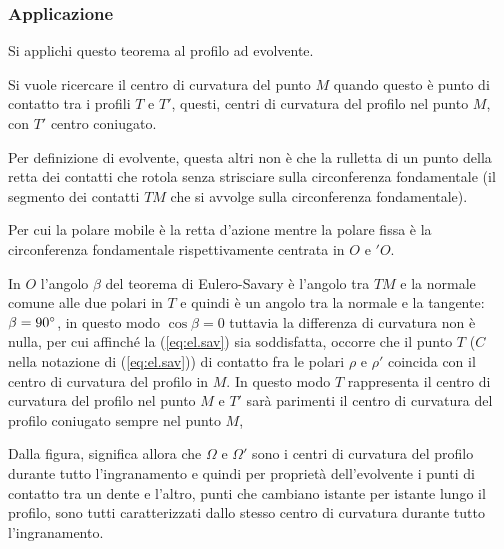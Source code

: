 \documentclass[a4paper, 15pt]{article}
\begin{document}
	\subsubsection{Applicazione}
	\begin{adjustwidth}{2in}{}
		Si applichi questo teorema al profilo ad evolvente.
		
		Si vuole ricercare il centro di curvatura del punto $M$ quando questo è punto di contatto tra i profili $T$ e $T'$, questi, centri di curvatura del profilo nel punto $M$, con $T'$ centro coniugato.
		
		Per definizione di evolvente, questa altri non è che la rulletta di un punto della retta dei contatti che rotola senza strisciare sulla circonferenza fondamentale (il segmento dei contatti $TM$ che si avvolge sulla circonferenza fondamentale). 
		
		Per cui la polare mobile è la retta d'azione mentre la polare fissa è la circonferenza fondamentale rispettivamente centrata in $O$ e $'O$. \newline
		
		In $O$ l'angolo $\beta$ del teorema di Eulero-Savary è l'angolo tra $TM$ e la normale comune alle due polari in $T$ e quindi è un angolo tra la normale e la tangente: $\beta=90\degree$, in questo modo $\cos\beta=0$ tuttavia la differenza di curvatura non è nulla, per cui affinché la (\ref{eq:el.sav}) sia soddisfatta, occorre che il punto $T$ ($C$ nella notazione di (\ref{eq:el.sav})) di contatto fra le polari $\rho$ e $\rho'$ coincida con il centro di curvatura del profilo in $M$. 
\newpage		
		In questo modo $T$ rappresenta il centro di curvatura del profilo nel punto $M$ e $T'$ sarà parimenti il centro di curvatura del profilo coniugato sempre nel punto $M$, 
		
		Dalla figura, significa allora che $\Omega$ e $\Omega'$ sono i centri di curvatura del profilo durante tutto l'ingranamento e quindi per proprietà dell'evolvente i punti di contatto tra un dente e l'altro, punti che cambiano istante per istante lungo il profilo, sono tutti caratterizzati dallo stesso centro di curvatura durante tutto l'ingranamento.\newline 
		

\end{adjustwidth}
\end{document}

